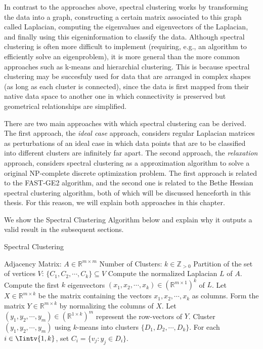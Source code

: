 In contrast to the approaches above, spectral clustering works by transforming the data into a graph, constructing a certain matrix associated to this graph called Laplacian, computing the eigenvalues and eigenvectors of the Laplacian, and finally using this eigeninformation to classify the data.
Although spectral clustering is often more difficult to implement (requiring, e.g., an algorithm to efficiently solve an eigenproblem), it is more general than the more common approaches such as k-means and hierarchial clustering.
This is because spectral clustering may be succesfuly used for data that are arranged in complex shapes (as long as each cluster is connected), since the data is first mapped from their native data space to another one in which connectivity is preserved but geometrical relationships are simplified.

There are two main approaches with which spectral clustering can be derived.
The first approach, the \textit{ideal case} approach, considers regular Laplacian matrices as perturbations of an ideal case in which data points that are to be classified into different clusters are infinitely far apart.
The second approach, the \textit{relaxation} approach, considers spectral clustering as a approximation algorithm to solve a original NP-complete discrete optimization problem.
The first approach is related to the FAST-GE2 algorithm, and the second one is related to the Bethe Hessian spectral clustering algorithm, both of which will be discussed henceforth in this thesis.
For this reason, we will explain both approaches in this chapter.

We show the Spectral Clustering Algorithm below and explain why it outputs a valid result in the subsequent sections.

\begin{algorithm}
\caption{Spectral Clustering}\label{spectral_clustering}
\begin{algorithmic}[1]
   \Require 
      \Statex Adjacency Matrix: $A \in \mathbb R ^ {m \times m}$ 
      \Statex Number of Clusters: $k \in \mathbb Z_{>0}$
   \Ensure 
      \Statex Partition of the set of vertices $V$: $\{ C_1, C_2, \cdots, C_k \} \subseteq V$
   \State Compute the normalized Laplacian $L$ of $A$.
   \State Compute the first $k$ eigenvectors $(x_1, x_2, \cdots, x_k) \in (\mathbb R^{m \times 1})^k$ of $L$.
   \State Let $X \in \mathbb R^{m \times k}$ be the matrix containing the vectors $x_1, x_2, \cdots, x_k$ as columns.
   \State Form the matrix $Y \in \mathbb R^{m \times k}$ by normalizing the columns of $X$.
   \State Let $(y_1, y_2, \cdots, y_m) \in ( \mathbb R^{1 \times k} )^m$ represent the row-vectors of $Y$.
   \State Cluster $(y_1, y_2, \cdots, y_m)$ using $k$-means into clusters $\{ D_1, D_2, \cdots, D_k \} $.
   \State For each $i \in \Iintv{1,k}$, set $C_i = \{ v_j: y_j \in D_i \}$.
\end{algorithmic}
\end{algorithm}




